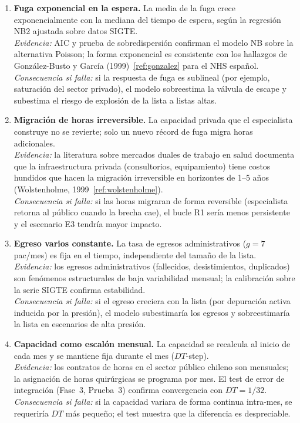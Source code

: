 \documentclass[12pt,a4paper]{article}
\begin{document}
\begin{enumerate}[leftmargin=1.5cm,label=\textbf{S\arabic*.}]

  \item \textbf{Fuga exponencial en la espera.} La media de la fuga crece exponencialmente con la mediana del tiempo de espera, según la regresión NB2 ajustada sobre datos SIGTE.\\
        \textit{Evidencia:} AIC y prueba de sobredispersión confirman el modelo NB sobre la alternativa Poisson; la forma exponencial es consistente con los hallazgos de González-Busto y García (1999)~\ref{ref:gonzalez} para el NHS español.\\
        \textit{Consecuencia si falla:} si la respuesta de fuga es sublineal (por ejemplo, saturación del sector privado), el modelo sobreestima la válvula de escape y subestima el riesgo de explosión de la lista a listas altas.

  \item \textbf{Migración de horas irreversible.} La capacidad privada que el especialista construye no se revierte; solo un nuevo récord de fuga migra horas adicionales.\\
        \textit{Evidencia:} la literatura sobre mercados duales de trabajo en salud documenta que la infraestructura privada (consultorios, equipamiento) tiene costos hundidos que hacen la migración irreversible en horizontes de 1--5 años (Wolstenholme, 1999~\ref{ref:wolstenholme}).\\
        \textit{Consecuencia si falla:} si las horas migraran de forma reversible (especialista retorna al público cuando la brecha cae), el bucle R1 sería menos persistente y el escenario E3 tendría mayor impacto.

  \item \textbf{Egreso varios constante.} La tasa de egresos administrativos ($g = 7$ pac/mes) es fija en el tiempo, independiente del tamaño de la lista.\\
        \textit{Evidencia:} los egresos administrativos (fallecidos, desistimientos, duplicados) son fenómenos estructurales de baja variabilidad mensual; la calibración sobre la serie SIGTE confirma estabilidad.\\
        \textit{Consecuencia si falla:} si el egreso creciera con la lista (por depuración activa inducida por la presión), el modelo subestimaría los egresos y sobreestimaría la lista en escenarios de alta presión.

  \item \textbf{Capacidad como escalón mensual.} La capacidad se recalcula al inicio de cada mes y se mantiene fija durante el mes ($DT$-step).\\
        \textit{Evidencia:} los contratos de horas en el sector público chileno son mensuales; la asignación de horas quirúrgicas se programa por mes. El test de error de integración (Fase~3, Prueba~3) confirma convergencia con $DT = 1/32$.\\
        \textit{Consecuencia si falla:} si la capacidad variara de forma continua intra-mes, se requeriría $DT$ más pequeño; el test muestra que la diferencia es despreciable.


\end{enumerate}
\end{document}
